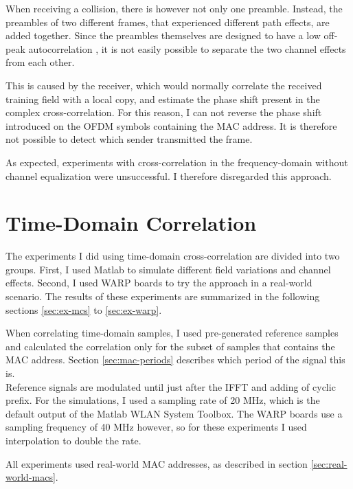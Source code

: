 When receiving a collision, there is however not only one preamble. Instead, the preambles of two different frames, that experienced different path effects, are added together. Since the preambles themselves are designed to have a low off-peak autocorrelation \cite{ieee2012}, it is not easily possible to separate the two channel effects from each other.

This is caused by the receiver, which would normally correlate the received training field with a local copy, and estimate the phase shift present in the complex cross-correlation. For this reason, I can not reverse the phase shift introduced on the \gls{OFDM} symbols containing the \gls{MAC} address. It is therefore not possible to detect which sender transmitted the frame.

As expected, experiments with cross-correlation in the frequency-domain without channel equalization were unsuccessful. I therefore disregarded this approach.



\section{Time-Domain Correlation}

The experiments I did using time-domain cross-correlation are divided into two groups. First, I used Matlab to simulate different field variations and channel effects. Second, I used WARP boards to try the approach in a real-world scenario. The results of these experiments are summarized in the following sections \ref{sec:ex-mcs} to \ref{sec:ex-warp}.

When correlating time-domain samples, I used pre-generated reference samples and calculated the correlation only for the subset of samples that contains the \gls{MAC} address. Section \ref{sec:mac-periods} describes which period of the signal this is.\\

Reference signals are modulated until just after the \gls{IFFT} and adding of cyclic prefix. For the simulations, I used a sampling rate of 20 MHz, which is the default output of the Matlab WLAN System Toolbox. The WARP boards use a sampling frequency of 40 MHz however, so for these experiments I used interpolation to double the rate.

All experiments used real-world \gls{MAC} addresses, as described in section \ref{sec:real-world-macs}.


